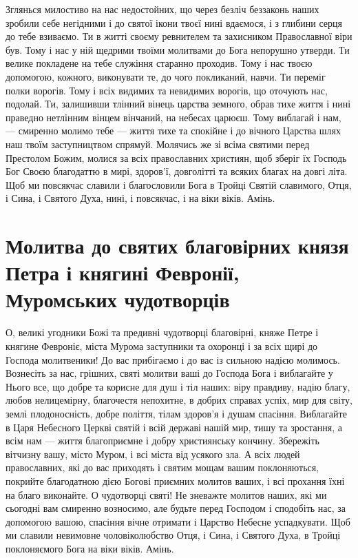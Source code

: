 \documentclass[chapters.tex]{subfiles}
\begin{document}
Зглянься милостиво на нас недостойних, що через безліч беззаконь наших зробили себе негідними і до святої ікони твоєї нині вдаємося, і з глибини серця до тебе взиваємо. Ти в житті своєму ревнителем та захисником Православної віри був. Тому і нас у ній щедрими твоїми молитвами до Бога непорушно утверди. Ти велике покладене на тебе служіння старанно проходив. Тому і нас твоєю допомогою, кожного, виконувати те, до чого покликаний, навчи. Ти переміг полки ворогів. Тому і всіх видимих та невидимих ворогів, що оточують нас, подолай. Ти, залишивши тлінний вінець царства земного, обрав тихе життя і нині праведно нетлінним вінцем вінчаний, на небесах царюєш. Тому виблагай і нам, — смиренно молимо тебе — життя тихе та спокійне і до вічного Царства шлях наш твоїм заступництвом спрямуй. Молячись же зі всіма святими перед Престолом Божим, молися за всіх православних християн, щоб зберіг їх Господь Бог Своєю благодаттю в мирі, здоров’ї, довголітті та всяких благах на довгі літа. Щоб ми повсякчас славили і благословили Бога в Тройці Святій славимого, Отця, і Сина, і Святого Духа, нині, і повсякчас, і на віки віків. Амінь.

\section{Молитва до святих благовірних князя Петра і княгині Февронії, Муромських чудотворців}
О, великі угодники Божі та предивні чудотворці благовірні, княже Петре і княгине Февроніє, міста Мурома заступники та охоронці і за всіх щирі до Господа молитвеники! До вас прибігаємо і до вас із сильною надією молимось. Вознесіть за нас, грішних, святі молитви ваші до Господа Бога і виблагайте у Нього все, що добре та корисне для душ і тіл наших: віру правдиву, надію благу, любов нелицемірну, благочестя непохитне, в добрих справах успіх, мир для світу, землі плодоносність, добре поліття, тілам здоров’я і душам спасіння. Виблагайте в Царя Небесного Церкві святій і всій державі нашій мир, тишу та зростання, а всім нам — життя благоприємне і добру християнську кончину. Збережіть вітчизну вашу, місто Муром, і всі міста від усякого зла. А всіх людей православних, які до вас приходять і святим мощам вашим поклоняються, покрийте благодатною дією Богові приємних молитов ваших, і всі прохання їхні на благо виконайте. О чудотворці святі! Не зневажте молитов наших, які ми сьогодні вам смиренно возносимо, але будьте перед Господом і сподобіть нас, за допомогою вашою, спасіння вічне отримати і Царство Небесне успадкувати. Щоб ми славили невимовне чоловіколюбство Отця, і Сина, і Святого Духа, в Тройці поклоняємого Бога на віки віків. Амінь.
\end{document}
